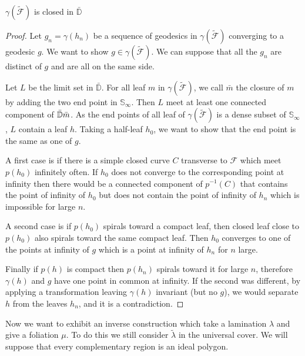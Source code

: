\begin{lem}
$\gamma(\tilde{\mathcal{F}})$ is closed in $\bar{\mathbb{D}}$
\end{lem}

\begin{proof}

Let $g_n=\gamma(h_n)$ be a sequence of geodesics in $\gamma(\tilde{\mathcal{F}})$ converging to a geodesic $g$. We want to show $g \in \gamma(\tilde{\mathcal{F}})$. We can suppose that all the $g_n$ are distinct of $g$ and are all on the same side.

\smallbreak
Let $L$ be the limit set in $\bar{\mathbb{D}}$. For all leaf $m$ in $\gamma(\tilde{\mathcal{F}})$, we call $\bar{m}$ the closure of $m$
 by adding the two end point in $\mathbb{S}_{\infty}$. Then $L$ meet at least one connected component of $\bar{\mathbb{D}} \\ \bar{m} $. As the end points of all leaf of $\gamma(\tilde{\mathcal{F}})$ is a dense subset of $\mathbb{S}_{\infty}$, $L$ contain a leaf $h$. Taking a half-leaf $h_0$, we want to show that the end point is the same as one of $g$.

\smallbreak
A first case is if there is a simple closed curve $C$  transverse to $\mathcal{F}$ which meet $p(h_0)$ infinitely often. If $h_0$ does not converge to the corresponding point at infinity then there would be a connected component of $p^{-1}(C)$ that contains the point of infinity of $h_0$ but does not contain the point of infinity of $h_n$ which is impossible for large $n$.

\smallbreak
A second case is if $p(h_0)$ spirals toward a compact leaf, then closed leaf close to $p(h_0)$ also spirals toward the same compact leaf. Then $h_0$ converges to one of the points at infinity of $g$ which is a point at infinity of $h_n$ for $n$ large.
\smallbreak

Finally if $p(h)$ is compact then $p(h_n)$ spirals toward it for large $n$, therefore $\gamma(h)$ and $g$ have one point in common at infinity. If the second was different, by applying a transformation leaving $\gamma(h)$ invariant (but no $g$), we would separate $h$ from the leaves $h_n$, and it is a contradiction.

\end{proof}

Now we want to exhibit an inverse construction which take a lamination $\lambda$ and give a foliation $\mu$. To do this we still consider $\tilde{\lambda}$ in the universal cover. We will suppose that every complementary region is an ideal polygon.

